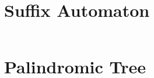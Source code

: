 \section{Suffix Automaton}

\inputminted{C++}{code/maximalist_tomato.cpp}

\section{Palindromic Tree}

\inputminted{C++}{code/palindromic_tree.cpp}

